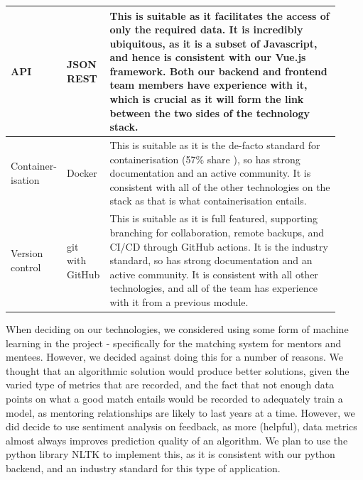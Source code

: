 \documentclass[10pt]{article}
\begin{document}
\begin{longtable}{|p{0.085\linewidth}|p{0.09\linewidth}|p{0.75\linewidth}|}
    API
    &
    JSON REST
    &
    This is suitable as it facilitates the access of only the required data. It
    is incredibly ubiquitous, as it is a subset of Javascript, and hence is
    consistent with our Vue.js framework. Both our backend and frontend team
    members have experience with it, which is crucial as it will form the link
    between the two sides of the technology stack.
    \\ \hline

    Container- isation
    &
    Docker \cite{Docker}
    &
    This is suitable as it is the de-facto standard for containerisation (57\% share \cite{containerTools}),
    so has strong documentation and an active community. It is consistent with
    all of the other technologies on the stack as that is what containerisation
    entails. \\ \hline

    Version control
    &
    git with GitHub
    &
    This is suitable as it is full featured, supporting branching for collaboration,
    remote backups, and CI/CD through GitHub actions. It is the industry
    standard, so has strong documentation and an active community. It is
    consistent with all other technologies, and all of the team has experience
    with it from a previous module.
    \\ \hline

\end{longtable}

When deciding on our technologies, we considered using some form of machine
learning in the project - specifically for the matching system for mentors and
mentees. However, we decided against doing this for a number of reasons. We
thought that an algorithmic solution would produce better solutions, given the
varied type of metrics that are recorded, and the fact that not enough data
points on what a good match entails would be recorded to adequately train a
model, as mentoring relationships are likely to last years at a time. However,
we did decide to use sentiment analysis on feedback, as more (helpful), data
metrics almost always improves prediction quality of an algorithm. We plan to
use the python library NLTK to implement this, as it is consistent with our
python backend, and an industry standard for this type of application.
\end{document}
